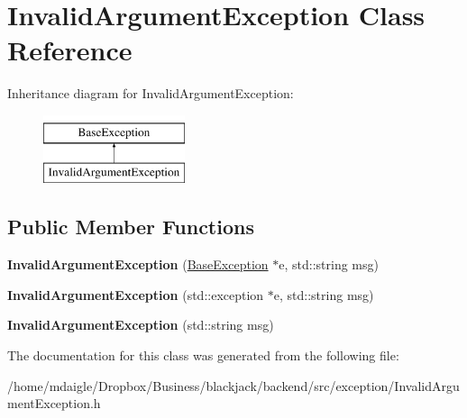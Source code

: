 \hypertarget{classInvalidArgumentException}{
\section{\-Invalid\-Argument\-Exception \-Class \-Reference}
\label{classInvalidArgumentException}
}
\-Inheritance diagram for \-Invalid\-Argument\-Exception\-:\begin{figure}[H]
\begin{center}
\leavevmode
\includegraphics[height=2.000000cm]{classInvalidArgumentException}
\end{center}
\end{figure}
\subsection*{\-Public \-Member \-Functions}
\begin{DoxyCompactItemize}
\item 
\hypertarget{classInvalidArgumentException_a9ab42a5af9457a697a51c1c904cca999}{
{\bfseries \-Invalid\-Argument\-Exception} (\hyperlink{classBaseException}{\-Base\-Exception} $\ast$e, std\-::string msg)}
\label{classInvalidArgumentException_a9ab42a5af9457a697a51c1c904cca999}

\item 
\hypertarget{classInvalidArgumentException_af805c0537aaf08c08b1e3045d897f426}{
{\bfseries \-Invalid\-Argument\-Exception} (std\-::exception $\ast$e, std\-::string msg)}
\label{classInvalidArgumentException_af805c0537aaf08c08b1e3045d897f426}

\item 
\hypertarget{classInvalidArgumentException_a07518bc7558997376aeaa4d293a3eb5a}{
{\bfseries \-Invalid\-Argument\-Exception} (std\-::string msg)}
\label{classInvalidArgumentException_a07518bc7558997376aeaa4d293a3eb5a}

\end{DoxyCompactItemize}


\-The documentation for this class was generated from the following file\-:\begin{DoxyCompactItemize}
\item 
/home/mdaigle/\-Dropbox/\-Business/blackjack/backend/src/exception/\-Invalid\-Argument\-Exception.\-h\end{DoxyCompactItemize}
